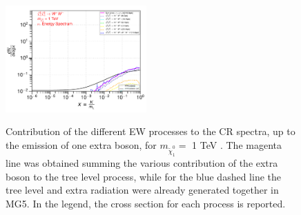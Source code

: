 \documentclass[epj,nopacs,fleqn]{svjour}
\begin{document}
\begin{figure}[!h]
	\subfigure
	{\includegraphics[width=0.48\textwidth]{Fig/n1ww_comparison/1000.0_neutrinos_tau_n1ww_comparison_1000.0.pdf} }
	
	\caption{Contribution of the different EW processes to the CR spectra, up to the emission of one extra boson, for $m_{\tilde \chi_1 ^0}=$ 1 TeV . The magenta line was obtained summing the various contribution of the extra boson to the tree level process, while for the blue dashed line the tree level and extra radiation were already generated together in MG5. In the legend, the cross section for each process is reported.}
	\label{ew_comparison_1}
\end{figure}
\end{document}
